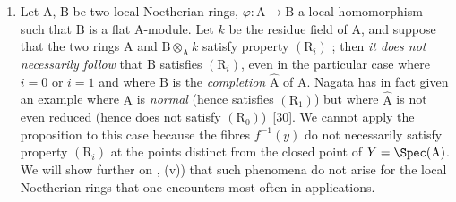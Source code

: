 \begin{remarks}[6.5.5]
\label{IV.6.5.5}
\medskip\noindent
\begin{enumerate}[label=(\roman*)]
  \item Let $\mathrm{A}$, $\mathrm{B}$ be two local Noetherian rings, $\varphi:\mathrm{A}\to\mathrm{B}$ a local homomorphism such that $\mathrm{B}$ is a flat $\mathrm{A}$-module.
Let $k$ be the residue field of $\mathrm{A}$, and suppose that the two rings $\mathrm{A}$ and $\mathrm{B}\otimes_\mathrm{A} k$ satisfy property $(\mathrm{R}_i)$ ; then \emph{it does not necessarily follow} that $\mathrm{B}$ satisfies $(\mathrm{R}_i)$, even in the particular case where $i=0$ or $i=1$ and where $\mathrm{B}$ is the \emph{completion} $\hat{\mathrm{A}}$ of $\mathrm{A}$.
Nagata has in fact given an example where $\mathrm{A}$ is \emph{normal} (hence satisfies $(\mathrm{R}_1)$) but where $\hat{\mathrm{A}}$ is not even reduced (hence does not satisfy $(\mathrm{R}_0)$)~[30].
We cannot apply the proposition  to this case because the fibres $f^{-1}(y)$ do not necessarily satisfy property $(\mathrm{R}_i)$ at the points distinct from the closed point of $Y=\Spec(\mathrm{A})$.
We will show further on , (v)) that such phenomena do not arise for the local Noetherian rings that one encounters most often in applications.


\end{enumerate}
\end{remarks}
